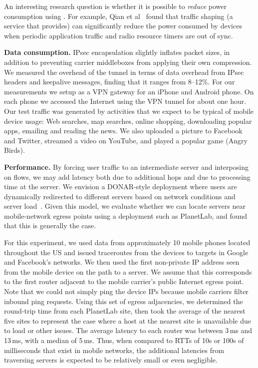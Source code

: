 An interesting research question is whether it is possible to \emph{reduce} power consumption using \meddle. For example, Qian et al~\cite{qian:rrc,qian:aro,qian:periodic} found that traffic shaping (a service that \meddle provides) can significantly reduce the power consumed by devices when periodic application traffic and radio resource timers are out of sync.

\noindent\textbf{Data consumption.} IPsec encapsulation slightly inflates packet sizes, in addition to
preventing carrier middleboxes from applying their own compression. We
measured the overhead of the tunnel in terms of data overhead from IPsec 
headers and keepalive
messages, finding that it ranges from 8--12\%. For our measurements we setup \meddle
as a VPN gateway for an iPhone and Android phone. On each phone
we accessed the Internet using the VPN tunnel for about one hour. Our
test traffic was generated by activities that we expect to be typical of mobile 
device usage: Web searches, map searches, online shopping, 
downloading popular apps, emailing and reading the news. We also uploaded a picture to 
Facebook and Twitter, streamed a video on YouTube, and played a popular game (Angry Birds). 

\noindent\textbf{Performance.} By forcing user traffic to an
intermediate server and interposing on flows, we may add latency both
due to additional hops and due to processing time at the \meddle
server. We envision a DONAR-style deployment where users are
dynamically redirected to different \meddle servers based on network
conditions and server load~\cite{wendell:donar}. Given this model, we
evaluate whether we can locate servers near mobile-network egress
points using a deployment such as PlanetLab, and found that this is
generally the case.

For this experiment, 
we used data from approximately 10 mobile phones located throughout
the US and issued traceroutes from the devices to targets in Google
and Facebook's networks. We then used the first non-private IP address seen 
from the mobile device on the path to a server. We assume that this corresponds 
to the first router adjacent to the mobile carrier's public Internet egress point. Note that we could not simply ping the device IPs because mobile carriers filter inbound ping requests. Using this set of egress adjacencies, we determined the round-trip time from each PlanetLab site, then took the average of the nearest five sites to represent the case where a host at the nearest site is unavailable due to load or other issues. The average latency to each router was between 3\,ms and 13\,ms, with a median of 5\,ms. Thus, when compared to RTTs of 10s or 100s of milliseconds that exist in mobile networks, the additional latencies from traversing \meddle servers is expected to be relatively small or even negligible.

